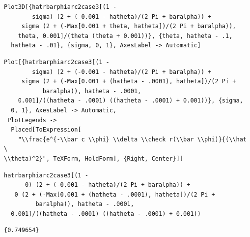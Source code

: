 \documentclass[reqno]{amsart}
\theoremstyle{definition} \newtheorem{definition}{Definition}[section]
\theoremstyle{definition} \newtheorem{remark}[definition]{Remark}
\theoremstyle{plain} \newtheorem{lemma}[definition]{Lemma}
\theoremstyle{plain} \newtheorem{proposition}[definition]{Proposition}
\theoremstyle{plain} \newtheorem{theorem}[definition]{Theorem}
\theoremstyle{plain} \newtheorem{corollary}[definition]{Corollary}
\theoremstyle{definition} \newtheorem{example}[definition]{Example}
\theoremstyle{plain} \newtheorem{claim}[clai]{Claim}
\theoremstyle{definition} \newtheorem{assumption}[definition]{Assumption}
\theoremstyle{definition} \newtheorem{observation}[definition]{Observation}
\newcommand{\1}{\mathbbm 1}
\newcommand{\sbig}{\bigskip}
\numberwithin{equation}{section} %
\theoremstyle{plain} \newtheorem*{theorem*}{Theorem}
\theoremstyle{plain} \newtheorem{mthm}[maintheorem]{Main Theorem}
\theoremstyle{plain} \newtheorem*{mthm*}{Main Theorem}
\theoremstyle{plain} \newtheorem*{conjecture*}{Conjecture}
\theoremstyle{plain} \newtheorem{conjecture}[definition]{Conjecture}
\theoremstyle{plain} \newtheorem*{problem*}{Problem}
\begin{document}
\begin{verbatim}
Plot3D[{hatrbarphiarc2case3[(1 - 
        sigma) (2 + (-0.001 - hatheta)/(2 Pi + baralpha)) + 
     sigma (2 + (-Max[0.001 + theta, hatheta])/(2 Pi + baralpha)), 
    theta, 0.001]/(theta (theta + 0.001))}, {theta, hatheta - .1, 
  hatheta - .01}, {sigma, 0, 1}, AxesLabel -> Automatic]
\end{verbatim}
\begin{verbatim}
Plot[{hatrbarphiarc2case3[(1 - 
        sigma) (2 + (-0.001 - hatheta)/(2 Pi + baralpha)) + 
     sigma (2 + (-Max[0.001 + (hatheta - .0001), hatheta])/(2 Pi + 
           baralpha)), hatheta - .0001, 
    0.001]/((hatheta - .0001) ((hatheta - .0001) + 0.001))}, {sigma, 
  0, 1}, AxesLabel -> Automatic, 
 PlotLegends -> 
  Placed[ToExpression[
    "\\frac{e^{-\\bar c \\phi} \\delta \\check r(\\bar \\phi)}{(\\hat \
\\theta)^2}", TeXForm, HoldForm], {Right, Center}]]
\end{verbatim}
\begin{verbatim}
hatrbarphiarc2case3[(1 - 
      0) (2 + (-0.001 - hatheta)/(2 Pi + baralpha)) + 
   0 (2 + (-Max[0.001 + (hatheta - .0001), hatheta])/(2 Pi + 
         baralpha)), hatheta - .0001, 
  0.001]/((hatheta - .0001) ((hatheta - .0001) + 0.001))
\end{verbatim}
\begin{verbatim}
{0.749654}
\end{verbatim}

\sbig
\end{document}

